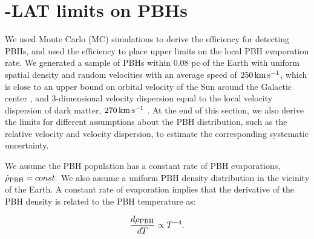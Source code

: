 \section{\Fermi-LAT limits on PBH\MakeLowercase{s}}
\label{sec:MClimit}

We used Monte Carlo (MC) simulations to derive the efficiency for detecting PBHs, and used the efficiency to place upper limits on the local PBH evaporation rate.
We generated a sample of PBHs within 0.08 pc of the Earth with uniform spatial density and random velocities with an average speed of
$250\rm\,km\, s^{-1}$, which is close to an upper bound on orbital velocity of the Sun around the Galactic center
\citep{1999MNRAS.310..645W, 2008ApJ...684.1143X, 2009PASJ...61..227S, 2010ApJ...720L.108G, 2010MNRAS.402..934M, 2011MNRAS.414.2446M},
and 3-dimensional velocity dispersion equal to the local velocity dispersion of dark matter, $270\rm\,km\, s^{-1}$ \citep{2010JCAP...02..030K}.
At the end of this section, we also derive the limits for different assumptions about the PBH distribution, such as the relative velocity and 
velocity dispersion, to estimate the corresponding systematic uncertainty.

We assume the PBH population has a constant rate of PBH evaporations,
$\dot{\rho}_{\rm PBH} = const.$
We also assume a uniform PBH density distribution in the vicinity of the Earth. 
A constant rate of evaporation implies that the derivative of the PBH density is related to the PBH temperature as:

\noindent
\begin{equation}
\label{eq:Tdistr}
\frac{d \rho_{\rm PBH}}{d T} \propto T^{-4}.
\end{equation}



